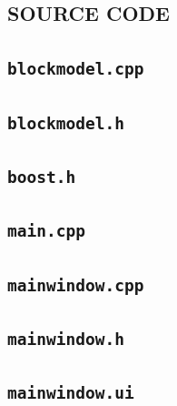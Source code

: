 \documentclass[12pt]{report}
\newcommand{\codesnippet}[2]{
\begin{scriptsize}

\end{scriptsize}
}
\begin{document}
\begin{appendices}

\chapter{SOURCE CODE}

\section{\lstinline{blockmodel.cpp}}
\codesnippet{language=C++,breaklines,showstringspaces=false}{sourcecode/blockmodel.cpp}

\section{\lstinline{blockmodel.h}}
\codesnippet{language=C++,breaklines,showstringspaces=false}{sourcecode/blockmodel.h}

\section{\lstinline{boost.h}}
\codesnippet{language=C++,breaklines,showstringspaces=false}{sourcecode/boost.h}

\section{\lstinline{main.cpp}}
\codesnippet{language=C++,breaklines,showstringspaces=false}{sourcecode/main.cpp}

\section{\lstinline{mainwindow.cpp}}
\codesnippet{language=C++,breaklines,showstringspaces=false}{sourcecode/mainwindow.cpp}

\section{\lstinline{mainwindow.h}}
\codesnippet{language=C++,breaklines,showstringspaces=false}{sourcecode/mainwindow.h}

\section{\lstinline{mainwindow.ui}}
\codesnippet{language=C++,breaklines,showstringspaces=false}{sourcecode/mainwindow.ui}

\end{appendices}
\end{document}
